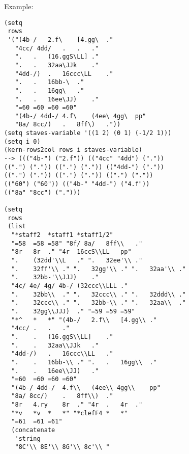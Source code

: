 \vspace{0.5cm}
\noindent Example:
\begin{verbatim}
(setq
 rows
 '("(4b-/	2.f\	[4.gg\	."
   "4cc/ 4dd/	.	.	."
   ".	.	(16.ggS\LL]	."
   ".	.	32aa\JJk	."
   "4dd-/)	.	16ccc\LL	."
   ".	.	16bb-\	."
   ".	.	16gg\	."
   ".	.	16ee\JJ)	."
   "=60	=60	=60	=60"
   "(4b-/ 4dd-/	4.f\	(4ee\ 4gg\	pp"
   "8a/ 8cc/)	.	8ff\)	."))
(setq staves-variable '((1 2) (0 1) (-1/2 1)))
(setq i 0)
(kern-rows2col rows i staves-variable)
--> ((("4b-") ("2.f")) (("4cc" "4dd") ("."))
((".") (".")) ((".") (".")) (("4dd-") ("."))
((".") (".")) ((".") (".")) ((".") ("."))
(("60") ("60")) (("4b-" "4dd-") ("4.f"))
(("8a" "8cc") (".")))

(setq
 rows
 (list
  "*staff2	*staff1	*staff1/2"
  "=58	=58	=58" "8f/ 8a/	8ff\\	."
  "8r	8r	." "4r	16ccS\\LL	pp"
  ".	(32dd'\\L	." ".	32ee'\\	."
  ".	32ff'\\	." ".	32gg'\\	." ".	32aa'\\	."
  ".	32bb-'\\JJJ)	."
  "4c/ 4e/ 4g/ 4b-/	(32ccc\\LLL	."
  ".	32bb\\	." ".	32ccc\\	." ".	32ddd\\	."
  ".	32ccc\\	." ".	32bb-\\	." ".	32aa\\	."
  ".	32gg\\JJJ)	." "=59	=59	=59"
  "*^	*	*" "(4b-/	2.f\\	[4.gg\\	."
  "4cc/	.	.	."
  ".	.	(16.ggS\\LL]	."
  ".	.	32aa\\JJk	."
  "4dd-/)	.	16ccc\\LL	."
  ".	.	16bb-\\	." ".	.	16gg\\	."
  ".	.	16ee\\JJ)	."
  "=60	=60	=60	=60"
  "(4b-/ 4dd-/	4.f\\	(4ee\\ 4gg\\	pp"
  "8a/ 8cc/)	.	8ff\\)	."
  "8r	4.ry	8r	." "4r	.	4r	."
  "*v	*v	*	*" "*clefF4	*	*"
  "=61	=61	=61"
  (concatenate
   'string
   "8C'\\ 8E'\\ 8G'\\ 8c'\\	"

\end{verbatim}
